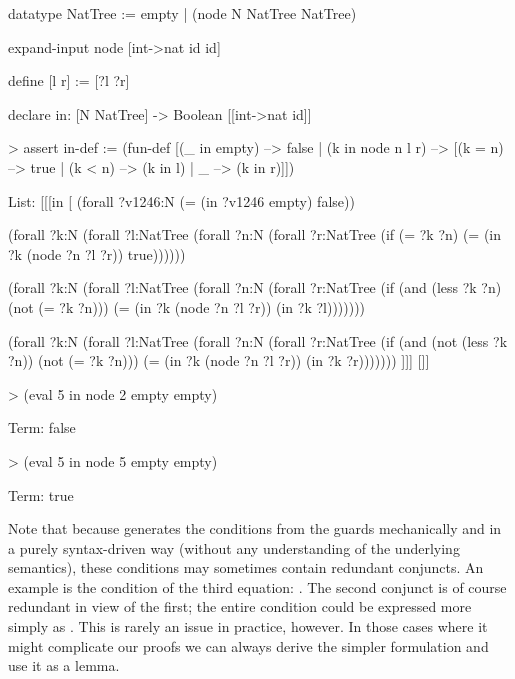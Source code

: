 \begin{tcAthena}
datatype NatTree := empty | (node N NatTree NatTree)

expand-input node [int->nat id id]

define [l r] := [?l ?r]

declare in: [N NatTree] -> Boolean [[int->nat id]]

> assert in-def :=
    (fun-def [(_ in empty) --> false
            | (k in node n l r) -->  [(k = n) --> true
                                    | (k < n) --> (k in l)
                                    | _ --> (k in r)]])

List: [[[in [
(forall ?v1246:N
  (= (in ?v1246 empty)
     false))
 
(forall ?k:N
  (forall ?l:NatTree
    (forall ?n:N
      (forall ?r:NatTree
        (if (= ?k ?n)
            (= (in ?k
                   (node ?n ?l ?r))
               true))))))
 
(forall ?k:N
  (forall ?l:NatTree
    (forall ?n:N
      (forall ?r:NatTree
        (if (and (less ?k ?n)
                 (not (= ?k ?n)))
            (= (in ?k
                   (node ?n ?l ?r))
               (in ?k ?l)))))))
 
(forall ?k:N
  (forall ?l:NatTree
    (forall ?n:N
      (forall ?r:NatTree
        (if (and (not (less ?k ?n))
                 (not (= ?k ?n)))
            (= (in ?k
                   (node ?n ?l ?r))
               (in ?k ?r)))))))
]]] []]

> (eval 5 in node 2 empty empty)

Term: false

> (eval 5 in node 5 empty empty)

Term: true
\end{tcAthena}
Note that because  generates the conditions from the guards mechanically
and in a purely syntax-driven way (without any understanding of the underlying
semantics), these conditions may sometimes contain redundant conjuncts. An example
is the condition of the third equation: .
The second conjunct is of course redundant in view of the first; the
entire condition could be expressed more simply as . 
This is rarely an issue in practice, however. In those cases where it might
complicate our proofs we can always derive the simpler formulation and use 
it as a lemma. 

